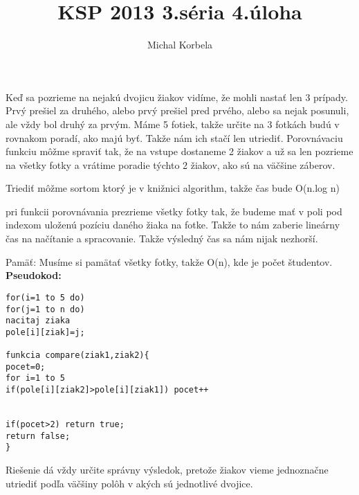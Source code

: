 \documentclass[a4paper,11pt]{article}
\title{KSP 2013 3.séria 4.úloha}
\author{Michal Korbela}
\begin{document}
Keď sa pozrieme na nejakú dvojicu žiakov vidíme, že mohli nastať len 3 prípady. Prvý prešiel za druhého, alebo prvý prešiel pred prvého, alebo sa nejak posunuli, ale vždy bol druhý za prvým. Máme 5 fotiek, takže určite na 3 fotkách budú v rovnakom poradí, ako majú byť. Takže nám ich stačí len utriediť. Porovnávaciu funkciu môžme spraviť tak, že na vstupe dostaneme 2 žiakov a už sa len pozrieme na všetky fotky a vrátime poradie týchto 2 žiakov, ako sú na väčšine záberov.

Triediť môžme sortom ktorý je v knižnici algorithm, takže čas bude O(n.log n)
\newline

pri funkcii porovnávania prezrieme všetky fotky tak, že budeme mať v poli pod indexom uloženú pozíciu daného žiaka na fotke. Takže to nám zaberie lineárny čas na načítanie a spracovanie.
Takže výsledný čas sa nám nijak nezhorší.

Pamäť: Musíme si pamätať všetky fotky, takže O(n), kde je počet študentov.
\\

\textbf{Pseudokod:}\\
\begin{lstlisting}
for(i=1 to 5 do)
for(j=1 to n do)
nacitaj ziaka
pole[i][ziak]=j;

funkcia compare(ziak1,ziak2){
pocet=0;
for i=1 to 5
if(pole[i][ziak2]>pole[i][ziak1]) pocet++


if(pocet>2) return true;
return false;
}
\end{lstlisting}


Riešenie dá vždy určite správny výsledok, pretože žiakov vieme jednoznačne utriediť podľa väčšiny polôh v akých sú jednotlivé dvojice.
\end{document}
